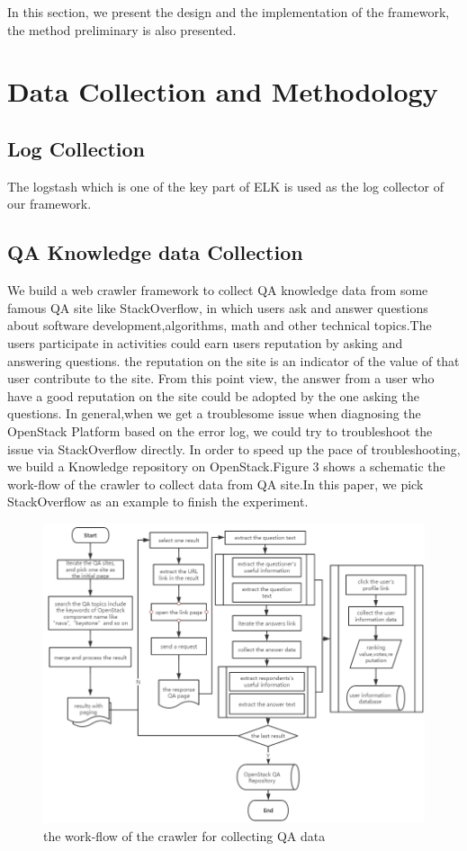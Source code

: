 
In this section, we present the design and the implementation of the framework, the method preliminary is also presented.
\section{Data Collection and Methodology}

\subsection{Log Collection}
The logstash which is one of the key part of ELK is used as the log collector of our framework.

\subsection{QA Knowledge data Collection}

We build a web crawler framework to collect QA knowledge data from some famous QA site like StackOverflow, in which users ask and answer questions about software development,algorithms, math and other technical topics.The users participate in activities could earn users reputation by asking and answering questions. the reputation on the site is an indicator of the value of that user contribute to the site. From this point view, the answer from a user who have a good reputation on the site could be adopted by the one asking the questions. In general,when we get a troublesome issue when diagnosing the OpenStack Platform based on the error log, we could try to troubleshoot the issue via StackOverflow directly. In order to speed up the pace of troubleshooting, we build a Knowledge repository on OpenStack.Figure 3 shows a schematic the work-flow of the crawler to collect data from QA site.In this paper, we pick StackOverflow as an example to finish the experiment. \\
\begin{figure}[!h]
\includegraphics[scale=0.5]{./figures/Fig3.png} 
\caption{the work-flow of the crawler for collecting QA data}
\end{figure}


